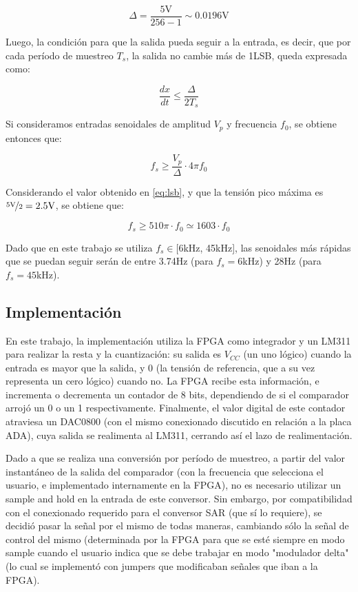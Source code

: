 \documentclass[assd_tp3_main.tex]{subfiles}
\begin{document}
\begin{equation}
	\Delta = \frac{5\mathrm{V}}{256-1} \sim 0.0196\mathrm{V}
	\label{eq:lsb}
\end{equation}

Luego, la condici\'on para que la salida pueda seguir a la entrada, es decir, que por cada per\'iodo de muestreo $T_s$, la salida no cambie m\'as de 1LSB, queda expresada como:

\begin{equation}
	\frac{dx}{dt} \leq \frac{\Delta}{2T_s}
\end{equation}

Si consideramos entradas senoidales de amplitud $V_p$ y frecuencia $f_0$, se obtiene entonces que:

\begin{equation}
	f_s \geq \frac{V_p}{\Delta} \cdot 4\pi f_0
	\label{eq:deriv}
\end{equation}

Considerando el valor obtenido en \ref{eq:lsb}, y que la tensi\'on pico m\'axima es $\nicefrac{5\mathrm{V}}{2} = 2.5\mathrm{V}$, se obtiene que:

\begin{equation}
	f_s \geq 510 \pi \cdot f_0 \simeq 1603 \cdot f_0
	\label{eq:f-sin}
\end{equation}

Dado que en este trabajo se utiliza $f_s \in [6$kHz, 45kHz], las senoidales m\'as r\'apidas que se puedan seguir ser\'an de entre 3.74Hz (para $f_s=6$kHz) y 28Hz (para $f_s=45$kHz).


\subsection{Implementaci\'on}

En este trabajo, la implementaci\'on utiliza la FPGA como integrador y un LM311 para realizar la resta y la cuantizaci\'on: su salida es $V_{CC}$ (un uno l\'ogico) cuando la entrada es mayor que la salida, y 0 (la tensi\'on de referencia, que a su vez representa un cero l\'ogico) cuando no. La FPGA recibe esta informaci\'on, e incrementa o decrementa un contador de 8 bits, dependiendo de si el comparador arroj\'o un 0 o un 1 respectivamente. Finalmente, el valor digital de este contador atraviesa un DAC0800 (con el mismo conexionado discutido en relaci\'on a la placa ADA), cuya salida se realimenta al LM311, cerrando as\'i el lazo de realimentaci\'on.

Dado a que se realiza una conversi\'on por per\'iodo de muestreo, a partir del valor instant\'aneo de la salida del comparador (con la frecuencia que selecciona el usuario, e implementado internamente en la FPGA), no es necesario utilizar un sample and hold en la entrada de este conversor. Sin embargo, por compatibilidad con el conexionado requerido para el conversor SAR (que s\'i lo requiere), se decidi\'o pasar la se\~nal por el mismo de todas maneras, cambiando s\'olo la se\~nal de control del mismo (determinada por la FPGA  para que se est\'e siempre en modo sample cuando el usuario indica que se debe trabajar en modo "modulador delta" (lo cual se implement\'o con jumpers que modificaban se\~nales que iban a la FPGA).
\end{document}
